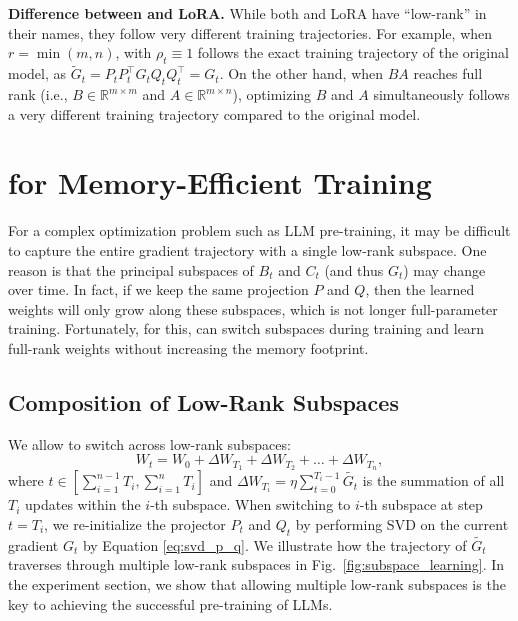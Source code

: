 \textbf{Difference between \lowrank{} and LoRA.}
While both \lowrank{} and LoRA have ``low-rank'' in their names, they follow very different training trajectories. For example, when $r = \min(m, n)$, \lowrank{} with $\rho_t \equiv 1$ follows the exact training trajectory of the original model, as $\tilde G_t = P_t P_t^{\top} G_t Q_t Q_t^\top = G_t$. On the other hand, when $BA$ reaches full rank (i.e., $B \in \mathbb{R}^{m \times m}$ and $A \in \mathbb{R}^{m \times n}$), optimizing $B$ and $A$ simultaneously follows a very different training trajectory compared to the original model.

\section{\lowrank{} for Memory-Efficient Training}
For a complex optimization problem such as LLM pre-training, it may be difficult to capture the entire gradient trajectory with a single low-rank subspace. One reason is that the principal subspaces of $B_t$ and $C_t$ (and thus $G_t$) may change over time. In fact, if we keep the same projection $P$ and $Q$, then the learned weights will only grow along these subspaces, which is not longer full-parameter training. Fortunately, for this, \lowrank{} can switch subspaces during training and learn full-rank weights without increasing the memory footprint.  


\subsection{Composition of Low-Rank Subspaces}
\label{sec:composition-subspace}

We allow \lowrank{} to switch across low-rank subspaces:
\begin{equation}
    \label{eq:represent_low_rank_updates_multiple}
    W_t = W_0 + \Delta W_{T_1} + \Delta W_{T_2} + \ldots + \Delta W_{T_n},
\end{equation}
where $t \in \left[\sum_{i=1}^{n-1} T_i, \sum_{i=1}^{n} T_i\right]$ and $\Delta W_{T_i} = \eta\sum_{t=0}^{T_i-1} \tilde{G_t}$ is the summation of all $T_i$ updates within the $i$-th subspace.
When switching to $i$-th subspace at step $t=T_i$, we re-initialize the projector $P_t$ and $Q_t$ by performing SVD on the current gradient $G_t$ by Equation \ref{eq:svd_p_q}.
We illustrate how the trajectory of $\tilde{G_t}$ traverses through multiple low-rank subspaces in Fig.~\ref{fig:subspace_learning}.
In the experiment section, we show that allowing multiple low-rank subspaces is the key to achieving the successful pre-training of LLMs.

